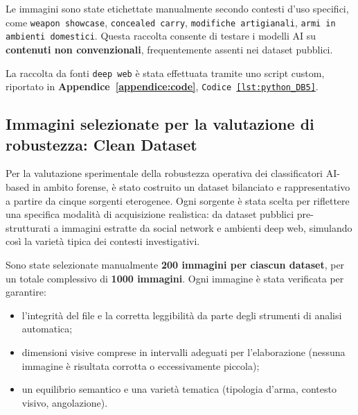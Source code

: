 Le immagini sono state etichettate manualmente secondo contesti d’uso specifici, come \texttt{weapon showcase}, \texttt{concealed carry}, \texttt{modifiche artigianali}, \texttt{armi in ambienti domestici}. Questa raccolta consente di testare i modelli AI su \textbf{contenuti non convenzionali}, frequentemente assenti nei dataset pubblici.

La raccolta da fonti \texttt{deep web} è stata effettuata tramite uno script custom, riportato in \textbf{Appendice~\ref{appendice:code}}, \texttt{Codice~\ref{lst:python_DB5}}.






\subsection*{Immagini selezionate per la valutazione di robustezza: Clean Dataset}
\label{subsec:dataset_finale}

Per la valutazione sperimentale della robustezza operativa dei classificatori AI-based in ambito forense, è stato costruito un dataset bilanciato e rappresentativo a partire da cinque sorgenti eterogenee. Ogni sorgente è stata scelta per riflettere una specifica modalità di acquisizione realistica: da dataset pubblici pre-strutturati a immagini estratte da social network e ambienti deep web, simulando così la varietà tipica dei contesti investigativi.

Sono state selezionate manualmente \textbf{200 immagini per ciascun dataset}, per un totale complessivo di \textbf{1000 immagini}. Ogni immagine è stata verificata per garantire:
\begin{itemize}
    \item l'integrità del file e la corretta leggibilità da parte degli strumenti di analisi automatica;
    \item dimensioni visive comprese in intervalli adeguati per l'elaborazione (nessuna immagine è risultata corrotta o eccessivamente piccola);
    \item un equilibrio semantico e una varietà tematica (tipologia d'arma, contesto visivo, angolazione).
\end{itemize}

